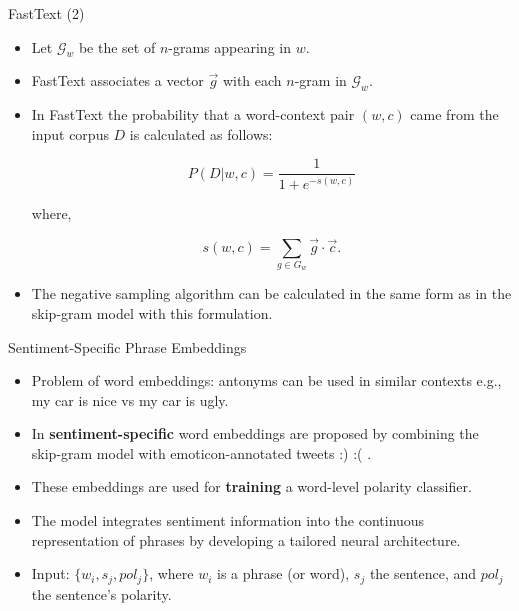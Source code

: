 \documentclass[handout]{beamer}
\begin{document}
\begin{frame}{FastText (2)}
\begin{scriptsize}
\begin{itemize}
  
\item Let $\mathcal{G}_{w}$ be the set of $n$-grams appearing in $w$.

\item FastText associates a vector $\vec{g}$ with each $n$-gram in $\mathcal{G}_{w}$.

\item In FastText the probability that  a word-context pair $(w, c)$ came from the input corpus $D$ is calculated as follows:

\begin{displaymath}
 P(D | w, c) = \frac{1}{1+e^{-s(w,c)}}
\end{displaymath}

where,

\begin{displaymath}
s(w,c) = \sum_{g \in {G}_{w}} \vec{g} \cdot \vec{c}.
\end{displaymath}

\item The negative sampling algorithm can be calculated in the same form as in the skip-gram model with this formulation.

\end{itemize}
\end{scriptsize}
\end{frame}





\begin{frame}{Sentiment-Specific Phrase Embeddings}
\begin{scriptsize}
\begin{itemize}
\item Problem of word embeddings: antonyms can be used in similar contexts e.g., my car is nice vs my car is ugly.

\item In \cite{TangCol14}  \textbf{sentiment-specific} word embeddings are proposed  by combining the skip-gram model with emoticon-annotated tweets :) :( .

\item These embeddings are used for \textbf{training} a word-level polarity classifier.

\item The model integrates sentiment information into the continuous representation of phrases by developing a tailored neural architecture.

\item Input: $\{w_i,s_j,pol_j\}$, where $w_i$ is a phrase (or word), $s_j$ the sentence, and $pol_j$ the sentence's polarity.

\end{itemize}
\end{scriptsize}
\end{frame}
\end{document}
